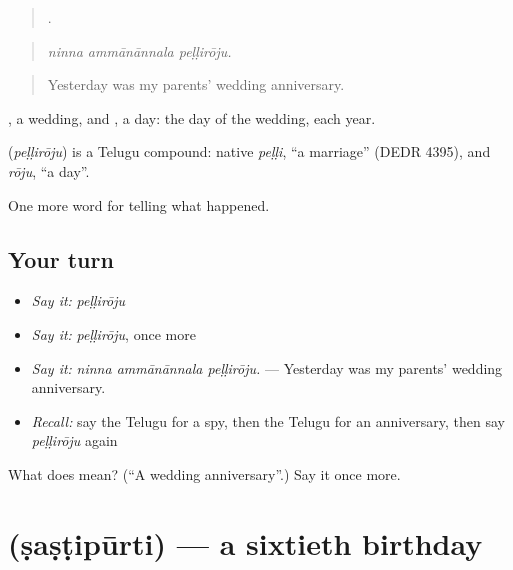 \begin{quote}
  .
\end{quote}

\begin{quote}
\emph{ninna ammānānnala peḷḷirōju.}
\end{quote}

\begin{quote}
Yesterday was my parents' wedding anniversary.
\end{quote}

, a wedding, and , a day: the day of the wedding, each year.

\begin{cousinweb}
\textbf{} (\emph{peḷḷirōju}) is a Telugu compound: native \emph{peḷḷi}, \textquotedblleft{}a marriage\textquotedblright{} (DEDR 4395), and \emph{rōju}, \textquotedblleft{}a day\textquotedblright{}.
\end{cousinweb}

\begin{grammarlens}[title={What you've built}]
One more word for telling what happened.
\end{grammarlens}

\subsection*{Your turn}
\begin{itemize}
\raggedright
  \item \emph{Say it:} \emph{peḷḷirōju}
  \item \emph{Say it:} \emph{peḷḷirōju}, once more
  \item \emph{Say it:} \emph{ninna ammānānnala peḷḷirōju.} — Yesterday was my parents' wedding anniversary.
  \item \emph{Recall:} say the Telugu for a spy, then the Telugu for an anniversary, then say \emph{peḷḷirōju} again
\end{itemize}

\begin{tcolorbox}[breakable,colback=teal!4,colframe=teal!35!black,title={Before you move on}]
What does  mean? (\textquotedblleft{}A wedding anniversary\textquotedblright{}.) Say it once more.
\end{tcolorbox}
\section[\texorpdfstring{\te{షష్టిపూర్తి} (ṣaṣṭipūrti)}{షష్టిపూర్తి (ṣaṣṭipūrti)}]{ (ṣaṣṭipūrti) — a sixtieth birthday}

